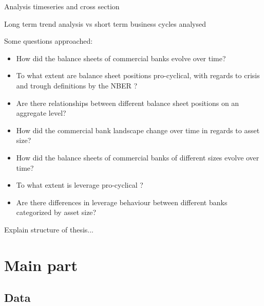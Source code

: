 \documentclass[12pt, a4paper]{article} %
\begin{document}
Analysis timeseries and cross section

Long term trend analysis vs short term business cycles analysed

Some questions approached: 
\begin{itemize}
\item How did the balance sheets of commercial banks evolve over time?
\item To what extent are balance sheet positions pro-cyclical, with regards to crisis and trough definitions by the NBER ?
\item Are there relationships between different balance sheet positions on an aggregate level?
\item How did the commercial bank landscape change over time in regards to asset size?
\item How did the balance sheets of commercial banks of different sizes evolve over time?
\item To what extent is leverage pro-cyclical ?
\item Are there differences in leverage behaviour between different banks categorized by asset size?
\end{itemize}

Explain structure of thesis...

\fi
\section{Main part}

\subsection{Data}
\label{sec:data}
\end{document}
